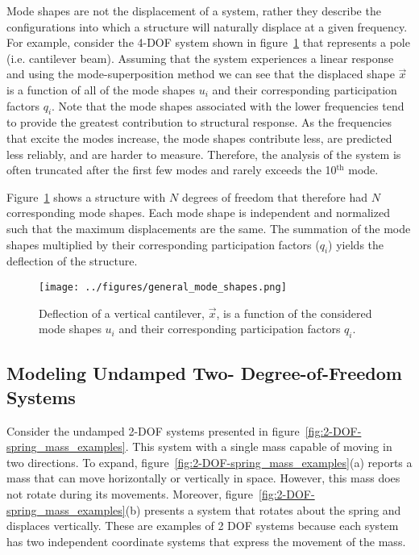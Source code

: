 \documentclass[12pt,letter]{article}
\begin{document}
	
	
	 
	
	Mode shapes are not the displacement of a system, rather they describe the configurations into which a structure will naturally displace at a given frequency. For example, consider the 4-DOF system shown in figure~\ref{fig:general_mode_shapes} that represents a pole (i.e. cantilever beam). Assuming that the system experiences a linear response and using the mode-superposition method we can see that the displaced shape $\vec{x}$ is a function of all of the mode shapes $u_i$ and their corresponding participation factors $q_i$. Note that the mode shapes associated with the lower frequencies tend to provide the greatest contribution to structural response. As the frequencies that excite the modes increase, the mode shapes contribute less, are predicted less reliably, and are harder to measure. Therefore, the analysis of the system is often truncated after the first few modes and rarely exceeds the 10$^{\text{th}}$ mode. 
	
	Figure~\ref{fig:general_mode_shapes} shows a structure with $N$ degrees of freedom that therefore had $N$ corresponding mode shapes. Each mode shape is independent and normalized such that the maximum displacements are the same. The summation of the mode shapes multiplied by their corresponding participation factors ($q_i$) yields the deflection of the structure. 
	
	
	\begin{figure}[H]
		\centering
		\texttt{[image: ../figures/general\_mode\_shapes.png]}
		\caption{Deflection of a vertical cantilever, $\vec{x}$, is a function of the considered mode shapes $u_i$ and their corresponding participation factors $q_i$.}
		\label{fig:general_mode_shapes}
	\end{figure}
	

	
	\subsection{Modeling Undamped Two- Degree-of-Freedom Systems}
	\label{sec:two_degree_of_freedom}
	
	Consider the undamped 2-DOF systems presented in figure~\ref{fig:2-DOF-spring_mass_examples}. This system with a single mass capable of moving in two directions. To expand, figure~\ref{fig:2-DOF-spring_mass_examples}(a) reports a mass that can move horizontally or vertically in space. However, this mass does not rotate during its movements. Moreover, figure~\ref{fig:2-DOF-spring_mass_examples}(b) presents a system that rotates about the spring and displaces vertically. These are examples of 2 DOF systems because each system has two independent coordinate systems that express the movement of the mass. 
	
\end{document}
